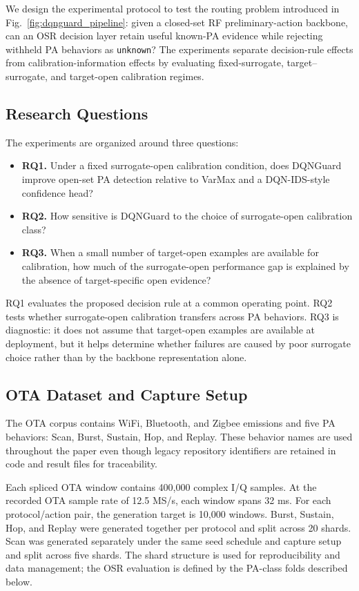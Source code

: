 We design the experimental protocol to test the routing problem introduced in Fig.~\ref{fig:dqnguard_pipeline}: given a closed-set RF preliminary-action backbone, can an OSR decision layer retain useful known-PA evidence while rejecting withheld PA behaviors as \texttt{unknown}? The experiments separate decision-rule effects from calibration-information effects by evaluating fixed-surrogate, target--surrogate, and target-open calibration regimes.

\subsection{Research Questions}
\label{subsec:rqs}

The experiments are organized around three questions:
\begin{itemize}
    \item \textbf{RQ1.} Under a fixed surrogate-open calibration condition, does DQNGuard improve open-set PA detection relative to VarMax and a DQN-IDS-style confidence head?
    \item \textbf{RQ2.} How sensitive is DQNGuard to the choice of surrogate-open calibration class?
    \item \textbf{RQ3.} When a small number of target-open examples are available for calibration, how much of the surrogate-open performance gap is explained by the absence of target-specific open evidence?
\end{itemize}

RQ1 evaluates the proposed decision rule at a common operating point. RQ2 tests whether surrogate-open calibration transfers across PA behaviors. RQ3 is diagnostic: it does not assume that target-open examples are available at deployment, but it helps determine whether failures are caused by poor surrogate choice rather than by the backbone representation alone.

\subsection{OTA Dataset and Capture Setup}
\label{subsec:dataset}

The OTA corpus contains WiFi, Bluetooth, and Zigbee emissions and five PA behaviors: Scan, Burst, Sustain, Hop, and Replay. These behavior names are used throughout the paper even though legacy repository identifiers are retained in code and result files for traceability.

Each spliced OTA window contains 400,000 complex I/Q samples. At the recorded OTA sample rate of 12.5 MS/s, each window spans 32 ms. For each protocol/action pair, the generation target is 10,000 windows. Burst, Sustain, Hop, and Replay were generated together per protocol and split across 20 shards. Scan was generated separately under the same seed schedule and capture setup and split across five shards. The shard structure is used for reproducibility and data management; the OSR evaluation is defined by the PA-class folds described below.

